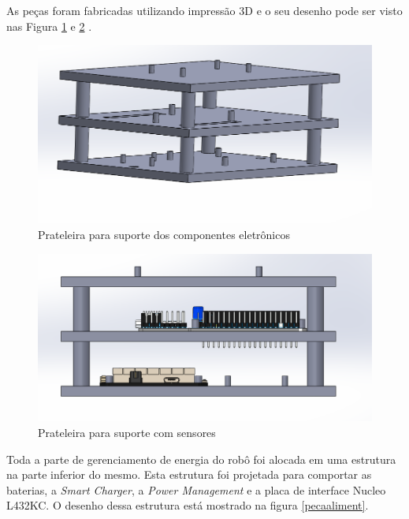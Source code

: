 As peças foram fabricadas utilizando impressão 3D e o seu desenho pode ser visto nas Figura \ref{Prateleira} e \ref{Prateleiracsensor} .

 \begin{figure}[h]
 	\centering
 	\includegraphics[width=14cm]{Figures/prateleira.png}
 	\caption{Prateleira para suporte dos componentes eletrônicos} \label{Prateleira}
 \end{figure}
 
  \begin{figure}[h]
  	\centering
  	\includegraphics[width=16cm]{Figures/prateleiracsensores.png}
  	\caption{Prateleira para suporte com sensores} \label{Prateleiracsensor}
  \end{figure}
 

Toda a parte de gerenciamento de energia do robô foi alocada em uma estrutura na parte inferior do mesmo. Esta estrutura foi projetada para comportar as baterias, a \textit{Smart Charger}, a \textit{Power Management} e a placa de interface Nucleo L432KC. O desenho dessa estrutura está mostrado na figura \ref{pecaaliment}.

